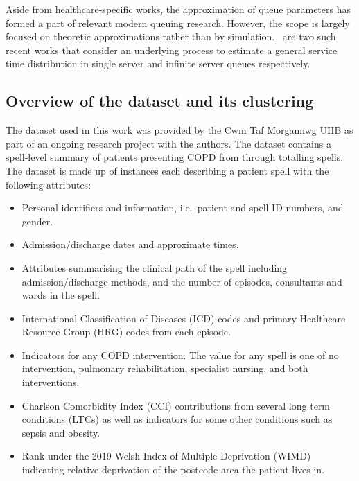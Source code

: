 Aside from healthcare-specific works, the approximation of
queue parameters has formed a part of relevant modern queuing research. However,
the scope is largely focused on theoretic approximations rather than by
simulation.~\cite{Djabali2018,Goldenshluger2016} are two such recent
works that consider an underlying process to estimate a general service time
distribution in single server and infinite server queues respectively.

\subsection{Overview of the dataset and its clustering}\label{subsec:overview}

The dataset used in this work was provided by the Cwm Taf Morgannwg UHB as part
of an ongoing research project with the authors. The dataset contains a
spell-level summary of patients presenting COPD from
through totalling
spells. The dataset is made up of instances each describing a
patient spell with the following attributes:
\begin{itemize}
    \item Personal identifiers and information, i.e.\ patient and spell ID
        numbers, and gender.
    \item Admission/discharge dates and approximate times.
    \item Attributes summarising the clinical path of the spell including
        admission/discharge methods, and the number of episodes, consultants and
        wards in the spell.
    \item International Classification of Diseases (ICD) codes and primary
        Healthcare Resource Group (HRG) codes from each episode.
    \item Indicators for any COPD intervention. The value for any spell is one
        of no intervention, pulmonary rehabilitation, specialist nursing, and
        both interventions.
    \item Charlson Comorbidity Index (CCI) contributions from several long term
        conditions (LTCs) as well as indicators for some other conditions such
        as sepsis and obesity.
    \item Rank under the 2019 Welsh Index of Multiple Deprivation (WIMD)
        indicating relative deprivation of the postcode area the patient lives
        in.
\end{itemize}

